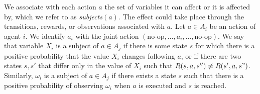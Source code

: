 \documentclass[letterpaper]{article} %
\newcommand{\ronen}[1]{\textbf{[\color{blue}RONEN:#1]}}
\begin{document}
We associate with each action $a$ the set of variables it can affect or it is affected by, which we refer to as  {\em subjects}$(a)$. 
The effect could take place through the transitions, rewards, or observations associated with $a$.
Let $a\in A_i$ be an action of agent $i$. We identify $a_i$ with the joint action $(\mbox{no-op},\ldots, a_i,\ldots,\mbox{no-op})$.
We say that variable $X_i$ is a subject of $a\in A_j$ if there is some state $s$ for which there is a positive probability that the value 
$X_i$ changes following $a$, or if there are two states $s,s'$ that differ only in the value of $X_i$ such that $R(s,a,s'')\neq R(s',a,s")$.
Similarly, $\omega_i$ is a subject of $a\in A_j$ if there exists a state $s$ such that there is a positive probability
of observing $\omega_i$ when $a$ is executed and $s$ is reached. 
\end{document}
